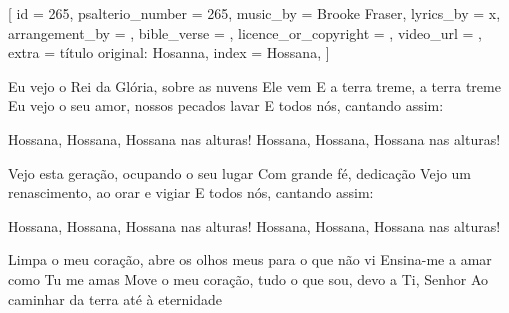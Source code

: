 [
    id                     = {265},
    psalterio_number       = {265},
    music_by               = {Brooke Fraser},
    lyrics_by              = {x},
    arrangement_by         = {},
    bible_verse            = {},
    licence_or_copyright   = {},
    video_url              = {},
    extra                  = {título original: Hosanna},
    index                  = {Hossana},
]


\beginverse
Eu vejo o Rei da Glória, sobre as nuvens Ele vem
E a terra treme, a terra treme
Eu vejo o seu amor, nossos pecados lavar
E todos nós, cantando assim:
\endverse


\beginchorus
Hossana, Hossana, Hossana nas alturas!
Hossana, Hossana, Hossana nas alturas!
\endchorus


\beginverse
Vejo esta geração, ocupando o seu lugar
Com grande fé, dedicação
Vejo um renascimento, ao orar e vigiar
E todos nós, cantando assim:
\endverse


\beginchorus
Hossana, Hossana, Hossana nas alturas!
Hossana, Hossana, Hossana nas alturas!
\endchorus


\beginverse
Limpa o meu coração, abre os olhos meus para o que não vi
Ensina-me a amar como Tu me amas
Move o meu coração, tudo o que sou, devo a Ti, Senhor
Ao caminhar da terra até à eternidade
\endverse

\endsong
